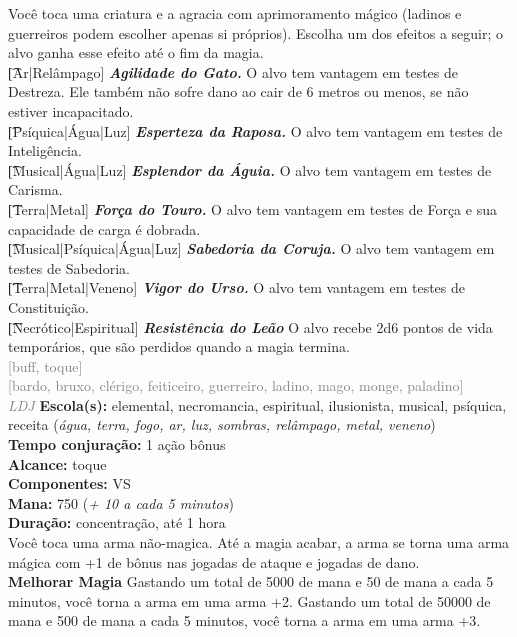 \documentclass{RPG_Adventure}[2021/10/20]
\begin{document}
{\normalsize Você toca uma criatura e a agracia com aprimoramento mágico (ladinos e guerreiros podem escolher apenas si próprios). Escolha um dos efeitos a seguir; o alvo ganha esse efeito até o fim da magia.\\\t [Ar|Relâmpago] \textbf{\textit{Agilidade do Gato.}} O alvo tem vantagem em testes de Destreza. Ele também não sofre dano ao cair de 6 metros ou menos, se não estiver incapacitado.\\\t [Psíquica|Água|Luz] \textbf{\textit{Esperteza da Raposa.}} O alvo tem vantagem em testes de Inteligência.\\\t [Musical|Água|Luz] \textbf{\textit{Esplendor da Águia.}} O alvo tem vantagem em testes de Carisma.\\\t [Terra|Metal] \textbf{\textit{Força do Touro.}} O alvo tem vantagem em testes de Força e sua capacidade de carga é dobrada.  \\\t [Musical|Psíquica|Água|Luz] \textbf{\textit{Sabedoria da Coruja.}} O alvo tem vantagem em testes de Sabedoria.\\\t [Terra|Metal|Veneno] \textbf{\textit{Vigor do Urso.}} O alvo tem vantagem em testes de Constituição.\\\t [Necrótico|Espiritual] \textbf{\textit{Resistência do Leão}} O alvo recebe 2d6 pontos de vida temporários, que são perdidos quando a magia termina.\\}
{\scriptsize \textcolor{gray}{[buff, toque]\\}}
{\scriptsize \textcolor{gray}{[bardo, bruxo, clérigo, feiticeiro, guerreiro, ladino, mago, monge, paladino]\\}}
{\tiny \textcolor{gray}{\textit{LDJ}}}\jump{}
{\small \t \textbf{Escola(s):} elemental, necromancia, espiritual, ilusionista, musical, psíquica, receita (\textit{água, terra, fogo, ar, luz, sombras, relâmpago, metal, veneno})\\\t \textbf{Tempo conjuração:} 1 ação bônus\\\t \textbf{Alcance:} toque\\\t \textbf{Componentes:} VS\\\t \textbf{Mana:} 750 (\textit{+ 10 a cada 5 minutos})\\\t \textbf{Duração:} concentração, até 1 hora\\}
{\normalsize Você toca uma arma não-magica. Até a magia acabar, a arma se torna uma arma mágica com +1 de bônus nas jogadas de ataque e jogadas de dano.\\\t \textbf{Melhorar Magia} Gastando um total de 5000 de mana e 50 de mana a cada 5 minutos, você torna a arma em uma arma +2. Gastando um total de 50000 de mana e 500 de mana a cada 5 minutos, você torna a arma em uma arma +3.\\}
\end{document}
